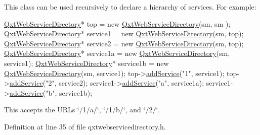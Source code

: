 This class can be used recursively to declare a hierarchy of services. For example\-: 
\begin{DoxyCode}
\hyperlink{class_qxt_web_service_directory}{QxtWebServiceDirectory}* top = \textcolor{keyword}{new} \hyperlink{class_qxt_web_service_directory_a6bf41820673aebe2a07a25f32c19f784}{QxtWebServiceDirectory}(sm, sm
      );
\hyperlink{class_qxt_web_service_directory}{QxtWebServiceDirectory}* service1 = \textcolor{keyword}{new} 
      \hyperlink{class_qxt_web_service_directory_a6bf41820673aebe2a07a25f32c19f784}{QxtWebServiceDirectory}(sm, top);
\hyperlink{class_qxt_web_service_directory}{QxtWebServiceDirectory}* service2 = \textcolor{keyword}{new} 
      \hyperlink{class_qxt_web_service_directory_a6bf41820673aebe2a07a25f32c19f784}{QxtWebServiceDirectory}(sm, top);
\hyperlink{class_qxt_web_service_directory}{QxtWebServiceDirectory}* service1a = \textcolor{keyword}{new} 
      \hyperlink{class_qxt_web_service_directory_a6bf41820673aebe2a07a25f32c19f784}{QxtWebServiceDirectory}(sm, service1);
\hyperlink{class_qxt_web_service_directory}{QxtWebServiceDirectory}* service1b = \textcolor{keyword}{new} 
      \hyperlink{class_qxt_web_service_directory_a6bf41820673aebe2a07a25f32c19f784}{QxtWebServiceDirectory}(sm, service1);
top->\hyperlink{class_qxt_web_service_directory_a296db6823177ac67fb9dfdb079ec9d2c}{addService}(\textcolor{stringliteral}{"1"}, service1);
top->\hyperlink{class_qxt_web_service_directory_a296db6823177ac67fb9dfdb079ec9d2c}{addService}(\textcolor{stringliteral}{"2"}, service2);
service1->\hyperlink{class_qxt_web_service_directory_a296db6823177ac67fb9dfdb079ec9d2c}{addService}(\textcolor{stringliteral}{"a"}, service1a);
service1->\hyperlink{class_qxt_web_service_directory_a296db6823177ac67fb9dfdb079ec9d2c}{addService}(\textcolor{stringliteral}{"b"}, service1b);
\end{DoxyCode}
 This accepts the U\-R\-Ls \char`\"{}/1/a/\char`\"{}, \char`\"{}/1/b/\char`\"{}, and \char`\"{}/2/\char`\"{}. 

Definition at line 35 of file qxtwebservicedirectory.\-h.



